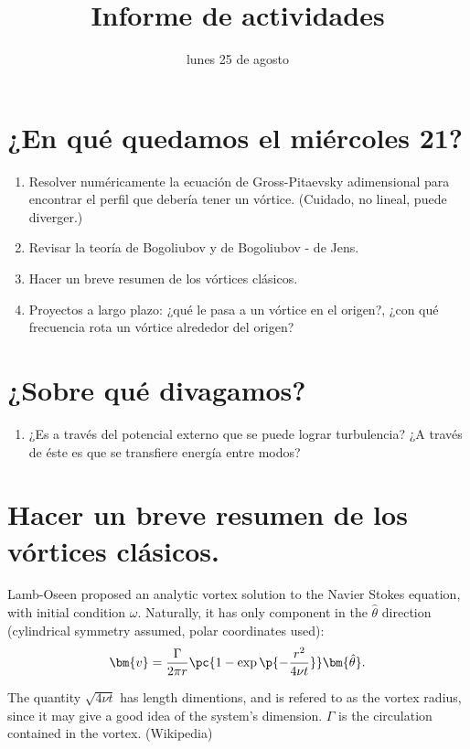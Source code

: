 \documentclass[10pt,letterpaper]{article}
\title{Informe de actividades}
\date{lunes 25 de agosto}
\begin{document}
\maketitle
\section*{¿En qué quedamos el miércoles 21?}

\begin{enumerate}
\item Resolver numéricamente la ecuación de Gross-Pitaevsky adimensional para encontrar el perfil que debería tener un vórtice. (Cuidado, no lineal, puede diverger.)
\item Revisar la teoría de Bogoliubov y de Bogoliubov - de Jens.
\item Hacer un breve resumen de los vórtices clásicos.
\item Proyectos a largo plazo: ¿qué le pasa a un vórtice en el origen?, ¿con qué frecuencia rota un vórtice alrededor del origen?
\end{enumerate}

\section*{¿Sobre qué divagamos?}
\begin{enumerate}
\item ¿Es a través del potencial externo que se puede lograr turbulencia? ¿A través de éste es que se transfiere energía entre modos?
\end{enumerate}

\section{Hacer un breve resumen de los vórtices clásicos.}
Lamb-Oseen proposed an analytic vortex solution to the Navier Stokes equation, with initial condition $\omega$. Naturally, it has only component in the $\hat{\theta}$ direction (cylindrical symmetry assumed, polar coordinates used):
\begin{equation}
\bm{v} = \frac{\Gamma}{2\pi r}\pc{1-\exp\p{-\frac{r^2}{4\nu t}}}\bm{\hat{\theta}}.
\end{equation}

The quantity $\sqrt{4\nu t}$ has length dimentions, and is refered to as the vortex radius, since it may give a good idea of the system's dimension. $\Gamma$ is the circulation contained in the vortex. (Wikipedia)
\end{document}
